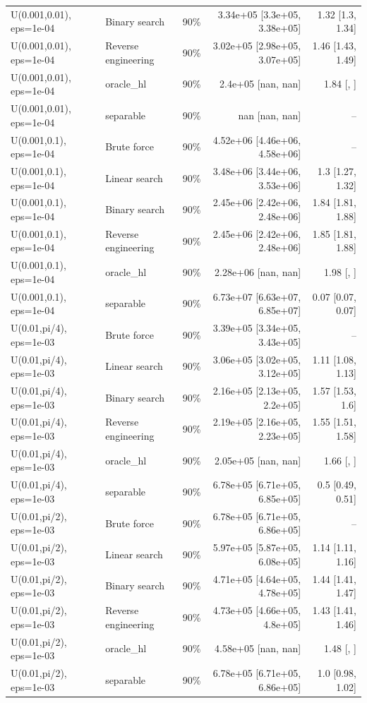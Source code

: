 \begin{tabular}{llrrr}
U(0.001,0.01), eps=1e-04 & Binary search & 90\% & 3.34e+05 [3.3e+05, 3.38e+05] & 1.32 [1.3, 1.34] \\
U(0.001,0.01), eps=1e-04 & Reverse engineering & 90\% & 3.02e+05 [2.98e+05, 3.07e+05] & 1.46 [1.43, 1.49] \\
U(0.001,0.01), eps=1e-04 & oracle_hl & 90\% & 2.4e+05 [nan, nan] & 1.84 [, ] \\
U(0.001,0.01), eps=1e-04 & separable & 90\% & nan [nan, nan] & -- \\
U(0.001,0.1), eps=1e-04 & Brute force & 90\% & 4.52e+06 [4.46e+06, 4.58e+06] & -- \\
U(0.001,0.1), eps=1e-04 & Linear search & 90\% & 3.48e+06 [3.44e+06, 3.53e+06] & 1.3 [1.27, 1.32] \\
U(0.001,0.1), eps=1e-04 & Binary search & 90\% & 2.45e+06 [2.42e+06, 2.48e+06] & 1.84 [1.81, 1.88] \\
U(0.001,0.1), eps=1e-04 & Reverse engineering & 90\% & 2.45e+06 [2.42e+06, 2.48e+06] & 1.85 [1.81, 1.88] \\
U(0.001,0.1), eps=1e-04 & oracle_hl & 90\% & 2.28e+06 [nan, nan] & 1.98 [, ] \\
U(0.001,0.1), eps=1e-04 & separable & 90\% & 6.73e+07 [6.63e+07, 6.85e+07] & 0.07 [0.07, 0.07] \\
U(0.01,pi/4), eps=1e-03 & Brute force & 90\% & 3.39e+05 [3.34e+05, 3.43e+05] & -- \\
U(0.01,pi/4), eps=1e-03 & Linear search & 90\% & 3.06e+05 [3.02e+05, 3.12e+05] & 1.11 [1.08, 1.13] \\
U(0.01,pi/4), eps=1e-03 & Binary search & 90\% & 2.16e+05 [2.13e+05, 2.2e+05] & 1.57 [1.53, 1.6] \\
U(0.01,pi/4), eps=1e-03 & Reverse engineering & 90\% & 2.19e+05 [2.16e+05, 2.23e+05] & 1.55 [1.51, 1.58] \\
U(0.01,pi/4), eps=1e-03 & oracle_hl & 90\% & 2.05e+05 [nan, nan] & 1.66 [, ] \\
U(0.01,pi/4), eps=1e-03 & separable & 90\% & 6.78e+05 [6.71e+05, 6.85e+05] & 0.5 [0.49, 0.51] \\
U(0.01,pi/2), eps=1e-03 & Brute force & 90\% & 6.78e+05 [6.71e+05, 6.86e+05] & -- \\
U(0.01,pi/2), eps=1e-03 & Linear search & 90\% & 5.97e+05 [5.87e+05, 6.08e+05] & 1.14 [1.11, 1.16] \\
U(0.01,pi/2), eps=1e-03 & Binary search & 90\% & 4.71e+05 [4.64e+05, 4.78e+05] & 1.44 [1.41, 1.47] \\
U(0.01,pi/2), eps=1e-03 & Reverse engineering & 90\% & 4.73e+05 [4.66e+05, 4.8e+05] & 1.43 [1.41, 1.46] \\
U(0.01,pi/2), eps=1e-03 & oracle_hl & 90\% & 4.58e+05 [nan, nan] & 1.48 [, ] \\
U(0.01,pi/2), eps=1e-03 & separable & 90\% & 6.78e+05 [6.71e+05, 6.86e+05] & 1.0 [0.98, 1.02] \\
\bottomrule
\end{tabular}
